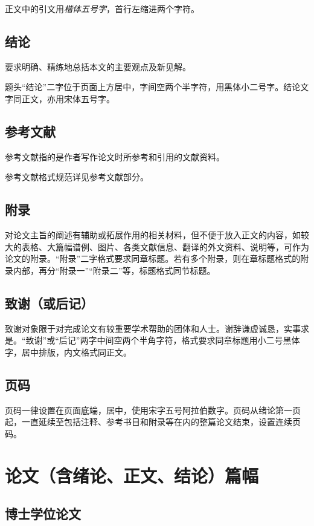 正文中的引文用\textit{楷体五号字}，首行左缩进两个字符。

\subsection{结论}

要求明确、精练地总括本文的主要观点及新见解。

题头“结论”二字位于页面上方居中，字间空两个半字符，用黑体小二号字。结论文字同正文，亦用宋体五号字。

\subsection{参考文献}

参考文献指的是作者写作论文时所参考和引用的文献资料。

参考文献格式规范详见参考文献部分。

\subsection{附录}

对论文主旨的阐述有辅助或拓展作用的相关材料，但不便于放入正文的内容，如较大的表格、大篇幅谱例、图片、各类文献信息、翻译的外文资料、说明等，可作为论文的附录。“附录”二字格式要求同章标题。若有多个附录，则在章标题格式的附录内部，再分“附录一”“附录二”等，标题格式同节标题。

\subsection{致谢（或后记）}

致谢对象限于对完成论文有较重要学术帮助的团体和人士。谢辞谦虚诚恳，实事求是。“致谢”或“后记”两字中间空两个半角字符，格式要求同章标题用小二号黑体字，居中排版，内文格式同正文。

\subsection{页码}

页码一律设置在页面底端，居中，使用宋字五号阿拉伯数字。页码从绪论第一页起，一直延续至包括注释、参考书目和附录等在内的整篇论文结束，设置连续页码。

\section{论文（含绪论、正文、结论）篇幅}

\subsection{博士学位论文}

